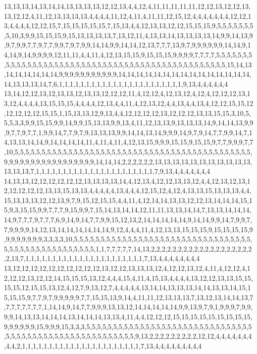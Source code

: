 13,13,13,14,13,14,14,13,13,13,13,12,12,13,4,4,12,4,11,11,11,11,11,12,12,13,12,12,13,13,12,12,4,11,12,13,13,13,13,4,4,4,4,11,12,4,11,4,11,11,12,15,12,4,4,4,4,4,4,4,12,12,13,4,4,4,4,12,12,15,7,15,15,15,15,15,7,15,13,4,4,12,13,13,12,12,15,15,15,9,5,5,5,5,5,5,5,5,10,3,9,9,15,15,15,9,15,13,13,13,13,7,13,12,11,4,13,13,14,13,13,13,13,14,9,9,14,13,9,9,7,9,9,7,7,9,7,7,9,9,7,9,7,9,9,14,14,9,9,14,14,12,13,7,7,7,13,9,7,9,9,9,9,9,9,14,14,9,14,14,9,14,9,9,9,9,12,11,11,4,4,11,4,12,13,15,15,9,15,15,15,9,9,9,9,7,7,7,7,5,5,5,5,5,5,5,5,5,5,5,5,5,5,5,5,5,5,5,5,5,5,5,5,5,5,5,5,5,5,5,5,5,5,5,5,5,5,5,5,5,5,5,5,5,5,5,5,15,14,13,14,14,14,14,14,14,9,9,9,9,9,9,9,9,9,9,9,14,14,14,14,14,14,14,14,14,14,14,14,14,14,14,14,13,13,13,14,7,6,1,1,1,1,1,1,1,1,1,1,1,1,1,1,1,1,1,1,1,1,1,1,1,9,13,4,4,4,4,4,4
13,14,12,12,13,12,13,13,12,13,13,12,12,12,11,4,12,12,4,12,13,12,4,12,4,12,12,12,13,13,12,4,4,4,4,13,15,15,15,4,4,4,4,12,13,4,4,11,4,12,13,12,4,4,13,4,4,13,4,12,12,15,15,12,12,12,12,12,15,15,1,15,13,13,12,9,13,4,4,12,12,12,12,13,12,12,12,13,13,15,15,3,10,5,5,5,3,3,9,9,15,15,9,9,14,9,9,15,13,13,9,9,13,4,11,12,13,13,9,13,13,13,14,9,14,14,13,9,9,9,7,7,9,7,7,1,9,9,14,7,7,9,7,9,13,13,13,9,9,14,14,13,14,9,9,9,14,9,7,9,14,7,7,9,9,14,7,14,13,13,14,14,9,14,14,14,14,11,4,11,4,11,4,12,13,15,9,9,9,15,15,9,15,15,9,7,7,9,9,9,7,7,10,5,5,5,5,5,5,5,5,5,5,5,5,5,5,5,5,5,5,5,5,5,5,5,5,5,5,5,5,5,5,5,5,5,5,5,5,5,5,5,5,5,5,5,5,9,9,9,9,9,9,9,9,9,9,9,9,9,9,9,9,9,14,14,14,2,2,2,2,2,2,13,13,13,13,13,13,13,13,13,13,13,13,13,13,7,1,1,1,1,1,1,1,1,1,1,1,1,1,1,1,1,1,1,1,1,1,1,7,9,13,4,4,4,4,4,4,4
14,13,13,12,12,12,12,12,12,13,13,13,13,14,4,12,13,4,12,12,13,13,12,4,4,12,13,12,13,12,12,12,12,12,13,13,15,13,13,4,4,4,4,4,13,4,4,4,12,15,12,4,12,4,13,13,15,13,13,13,4,4,15,13,13,13,12,12,13,9,7,9,15,12,15,15,4,4,11,4,12,14,14,13,13,12,12,13,14,14,14,15,15,9,3,15,15,9,9,7,7,7,9,15,9,9,7,15,14,13,14,14,12,11,11,13,13,14,14,7,13,13,14,14,14,14,9,7,7,7,9,7,7,7,6,9,14,9,14,7,7,9,9,15,12,13,2,14,14,14,14,14,9,14,14,9,9,14,7,9,9,7,7,9,9,9,9,14,12,13,14,14,14,14,14,14,9,12,4,4,4,11,4,12,13,13,15,15,15,9,15,15,15,15,9,9,9,9,9,9,9,9,3,3,3,3,10,5,5,5,5,5,5,5,5,5,5,5,5,5,5,5,5,5,5,5,5,5,5,5,5,5,5,5,5,5,5,5,5,5,5,5,5,5,5,5,5,5,5,5,5,5,5,5,5,5,5,1,1,7,7,7,7,7,14,13,2,2,2,2,2,2,2,2,2,2,2,2,2,2,2,2,2,2,2,2,13,7,1,1,1,1,1,1,1,1,1,1,1,1,1,1,1,1,1,1,1,1,1,1,7,13,4,4,4,4,4,4,4,4
13,12,12,12,12,12,12,12,12,12,12,13,12,12,13,13,13,12,4,12,12,13,12,4,11,4,12,12,4,12,12,12,13,12,12,14,15,15,15,13,12,4,4,4,15,4,11,4,15,13,4,4,4,4,13,12,12,13,13,15,15,15,15,12,15,15,13,12,4,12,7,9,13,12,7,4,4,4,4,4,13,14,14,13,13,13,14,14,13,13,14,15,15,15,15,9,7,7,9,7,9,9,9,9,9,7,7,15,15,13,9,14,4,11,11,12,13,13,13,7,13,12,13,14,14,13,7,7,7,7,7,7,7,7,1,14,14,9,14,7,7,9,9,9,13,13,12,14,14,14,14,14,9,9,13,9,7,9,1,9,9,9,7,9,9,9,9,14,13,13,14,14,14,13,14,14,14,13,13,4,11,4,4,12,12,12,15,15,15,15,15,15,15,15,15,9,9,9,9,9,9,15,9,9,9,15,3,3,3,5,5,5,5,5,5,5,5,5,5,5,5,5,5,5,5,5,5,5,5,5,5,5,5,5,5,5,5,5,5,5,5,5,5,5,5,5,5,5,5,5,5,5,5,5,5,5,5,5,5,5,5,5,5,5,9,13,2,2,2,2,2,2,2,2,2,12,12,4,4,4,4,4,4,4,4,4,2,1,1,1,1,1,1,1,1,1,1,1,1,1,1,1,1,1,1,1,1,1,1,7,13,4,4,4,4,4,4,4,4,4
